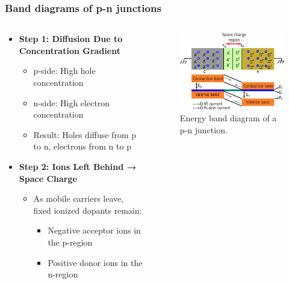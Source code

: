 \begin{frame}
	\frametitle{Band diagrams of p-n junctions}
	\begin{columns}
		\begin{column}{0.35\textwidth}
			\begin{itemize}
				\item \textbf{Step 1: Diffusion Due to Concentration Gradient}
				\begin{itemize}
					\item p-side: High hole concentration
					\item n-side: High electron concentration
					\item Result: Holes diffuse from p to n, electrons from n to p
				\end{itemize}
				\item \textbf{Step 2: Ions Left Behind → Space Charge}
				\begin{itemize}
					\item As mobile carriers leave, fixed ionized dopants remain:
					\begin{itemize}
						\item Negative acceptor ions in the p-region
						\item Positive donor ions in the n-region
					\end{itemize}
				\end{itemize}
			\end{itemize}
		\end{column}
		\begin{column}{0.7\textwidth}
			\begin{figure}
				\centering
				\includegraphics[scale=1.5]{fig/lec03/band_diagram_pn_junction_big.pdf}
				\caption{Energy band diagram of a p-n junction.}
				\label{fig:pn_junction}
			\end{figure}
		\end{column}
	\end{columns}
\end{frame}

